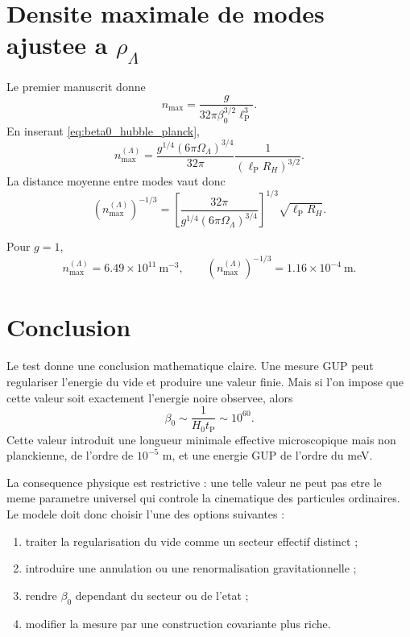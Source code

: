 \documentclass[11pt,a4paper]{article}
\newcommand{\lp}{\ell_{\mathrm P}}
\newcommand{\tP}{t_{\mathrm P}}
\newcommand{\rhoL}{\rho_{\Lambda}}
\newcommand{\OmL}{\Omega_{\Lambda}}
\begin{document}
\section{Densite maximale de modes ajustee a $\rhoL$}

Le premier manuscrit donne
\begin{equation}
n_{\max}=\frac{g}{32\pi\beta_0^{3/2}\lp^3}.
\end{equation}
En inserant \eqref{eq:beta0_hubble_planck},
\begin{equation}
\boxed{
n_{\max}^{(\Lambda)}
=
\frac{g^{1/4}(6\pi\OmL)^{3/4}}{32\pi}
\frac{1}{(\lp R_H)^{3/2}}.
}
\label{eq:nmax_lambda}
\end{equation}
La distance moyenne entre modes vaut donc
\begin{equation}
\boxed{
\left(n_{\max}^{(\Lambda)}\right)^{-1/3}
=
\left[\frac{32\pi}{g^{1/4}(6\pi\OmL)^{3/4}}\right]^{1/3}
\sqrt{\lp R_H}.
}
\label{eq:spacing_lambda}
\end{equation}

Pour $g=1$,
\begin{equation}
n_{\max}^{(\Lambda)}=6.49\times10^{11}\ \mathrm{m^{-3}},
\qquad
\left(n_{\max}^{(\Lambda)}\right)^{-1/3}=1.16\times10^{-4}\ \mathrm{m}.
\end{equation}

\section{Conclusion}

Le test donne une conclusion mathematique claire. Une mesure GUP peut
regulariser l'energie du vide et produire une valeur finie. Mais si l'on impose
que cette valeur soit exactement l'energie noire observee, alors
\begin{equation}
\beta_0\sim\frac{1}{H_0\tP}\sim10^{60}.
\end{equation}
Cette valeur introduit une longueur minimale effective microscopique mais non
planckienne, de l'ordre de $10^{-5}$ m, et une energie GUP de l'ordre du meV.

La consequence physique est restrictive : une telle valeur ne peut pas etre le
meme parametre universel qui controle la cinematique des particules ordinaires.
Le modele doit donc choisir l'une des options suivantes :
\begin{enumerate}
\item traiter la regularisation du vide comme un secteur effectif distinct ;
\item introduire une annulation ou une renormalisation gravitationnelle ;
\item rendre $\beta_0$ dependant du secteur ou de l'etat ;
\item modifier la mesure par une construction covariante plus riche.
\end{enumerate}
\end{document}
